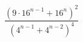 \begin{ex}[type=expression]
	\begin{condition}
		\( \dfrac{(9\cdot16^{n-1}+16^n)^2}{(4^{n-1}+4^{n-2})^4} \)
	\end{condition}
\end{ex}